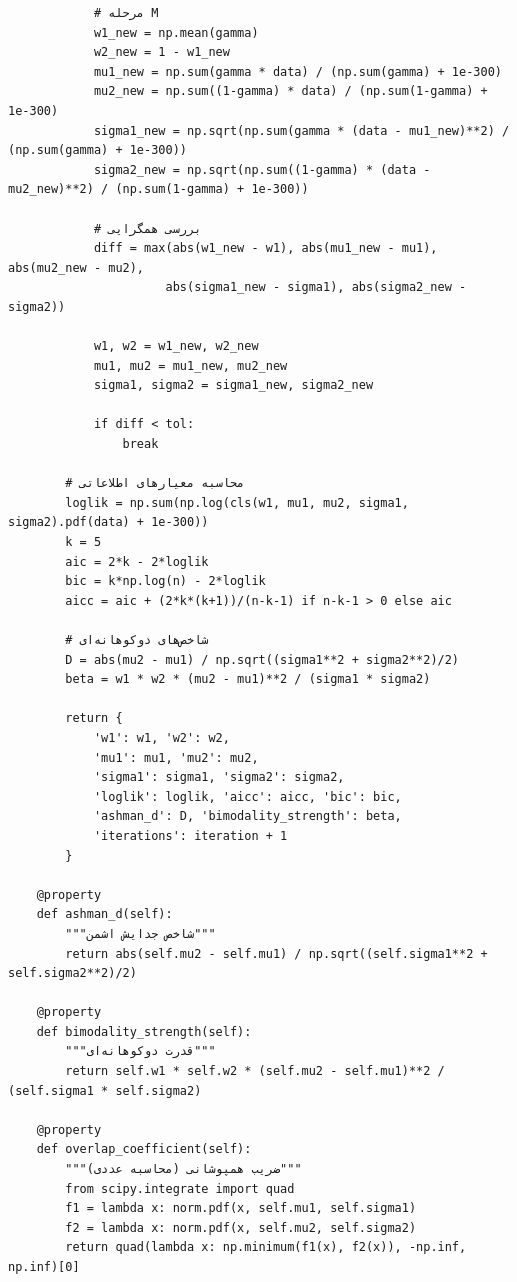 \documentclass[a4paper,12pt]{article}
\begin{document}
\begin{verbatim}
            # مرحله M
            w1_new = np.mean(gamma)
            w2_new = 1 - w1_new
            mu1_new = np.sum(gamma * data) / (np.sum(gamma) + 1e-300)
            mu2_new = np.sum((1-gamma) * data) / (np.sum(1-gamma) + 1e-300)
            sigma1_new = np.sqrt(np.sum(gamma * (data - mu1_new)**2) / (np.sum(gamma) + 1e-300))
            sigma2_new = np.sqrt(np.sum((1-gamma) * (data - mu2_new)**2) / (np.sum(1-gamma) + 1e-300))
            
            # بررسی همگرایی
            diff = max(abs(w1_new - w1), abs(mu1_new - mu1), abs(mu2_new - mu2),
                      abs(sigma1_new - sigma1), abs(sigma2_new - sigma2))
            
            w1, w2 = w1_new, w2_new
            mu1, mu2 = mu1_new, mu2_new
            sigma1, sigma2 = sigma1_new, sigma2_new
            
            if diff < tol:
                break
        
        # محاسبه معیارهای اطلاعاتی
        loglik = np.sum(np.log(cls(w1, mu1, mu2, sigma1, sigma2).pdf(data) + 1e-300))
        k = 5
        aic = 2*k - 2*loglik
        bic = k*np.log(n) - 2*loglik
        aicc = aic + (2*k*(k+1))/(n-k-1) if n-k-1 > 0 else aic
        
        # شاخص‌های دوکوهانه‌ای
        D = abs(mu2 - mu1) / np.sqrt((sigma1**2 + sigma2**2)/2)
        beta = w1 * w2 * (mu2 - mu1)**2 / (sigma1 * sigma2)
        
        return {
            'w1': w1, 'w2': w2,
            'mu1': mu1, 'mu2': mu2,
            'sigma1': sigma1, 'sigma2': sigma2,
            'loglik': loglik, 'aicc': aicc, 'bic': bic,
            'ashman_d': D, 'bimodality_strength': beta,
            'iterations': iteration + 1
        }
    
    @property
    def ashman_d(self):
        """شاخص جدایش اشمن"""
        return abs(self.mu2 - self.mu1) / np.sqrt((self.sigma1**2 + self.sigma2**2)/2)
    
    @property
    def bimodality_strength(self):
        """قدرت دوکوهانه‌ای"""
        return self.w1 * self.w2 * (self.mu2 - self.mu1)**2 / (self.sigma1 * self.sigma2)
    
    @property
    def overlap_coefficient(self):
        """ضریب همپوشانی (محاسبه عددی)"""
        from scipy.integrate import quad
        f1 = lambda x: norm.pdf(x, self.mu1, self.sigma1)
        f2 = lambda x: norm.pdf(x, self.mu2, self.sigma2)
        return quad(lambda x: np.minimum(f1(x), f2(x)), -np.inf, np.inf)[0]
\end{verbatim}
\end{document}
